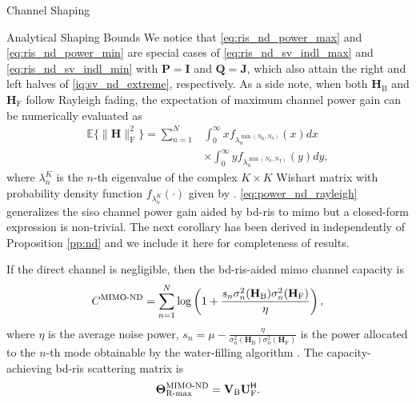 \documentclass[journal]{IEEEtran}
\begin{document}
\begin{section}{Channel Shaping}
\begin{subsection}{Analytical Shaping Bounds}
		We notice that \eqref{eq:ris_nd_power_max} and \eqref{eq:ris_nd_power_min} are special cases of \eqref{eq:ris_nd_sv_indl_max} and \eqref{eq:ris_nd_sv_indl_min} with $\mathbf{P} = \mathbf{I}$ and $\mathbf{Q} = \mathbf{J}$, which also attain the right and left halves of \eqref{iq:sv_nd_extreme}, respectively.
		As a side note, when both $\mathbf{H}_\mathrm{B}$ and $\mathbf{H}_\mathrm{F}$ follow Rayleigh fading, the expectation of maximum channel power gain can be numerically evaluated as
		\begin{equation}
			\label{eq:power_nd_rayleigh}
			\begin{split}
				\mathbb{E}\bigl\{ \lVert \mathbf{H} \rVert _ \mathrm{F}^2 \bigr\} = \sum_{n=1}^N
				& \int_0^\infty x f_{\lambda_n^{\min(N_\mathrm{R},N_\mathrm{S})}}(x) d x         \\
				& \times \int_0^\infty y f_{\lambda_n^{\min(N_\mathrm{S},N_\mathrm{T})}}(y) d y,
			\end{split}
		\end{equation}
		where $\lambda_n^{K}$ is the $n$-th eigenvalue of the complex $K \times K$ Wishart matrix with probability density function $f_{\lambda_n^{K}}(\cdot)$ given by \cite[(51)]{Zanella2009}.
		\eqref{eq:power_nd_rayleigh} generalizes the \gls{siso} channel power gain aided by \gls{bd}-\gls{ris} \cite[(58)]{Shen2020a} to \gls{mimo} but a closed-form expression is non-trivial.
		The next corollary has been derived in \cite{Bartoli2023} independently of Proposition \ref{pp:nd} and we include it here for completeness of results.
		\begin{corollary}
			\label{co:nd_capacity_snr_general}
			If the direct channel is negligible, then the \gls{bd}-\gls{ris}-aided \gls{mimo} channel capacity is
			\begin{equation}
				\label{eq:capacity_nd}
				C^\textnormal{MIMO-ND} = \sum_{n=1}^N \log \left(1 + \frac{s_n \sigma_n^2(\mathbf{H}_\mathrm{B}) \sigma_n^2(\mathbf{H}_\mathrm{F})}{\eta}\right),
			\end{equation}
			where $\eta$ is the average noise power, $s_n = \mu - \frac{\eta}{\sigma_n^2(\mathbf{H}_\mathrm{B}) \sigma_n^2(\mathbf{H}_\mathrm{F})}$ is the power allocated to the $n$-th mode obtainable by the water-filling algorithm \cite{Clerckx2013}.
			The capacity-achieving \gls{bd}-\gls{ris} scattering matrix is
			\begin{equation}
				\label{eq:ris_nd_rate_max}
				\mathbf{\Theta}_\textnormal{R-max}^\textnormal{MIMO-ND} = \mathbf{V}_\mathrm{B} \mathbf{U}_\mathrm{F}^\mathsf{H}.
			\end{equation}
		\end{corollary}


\end{subsection}
\end{section}
\end{document}
